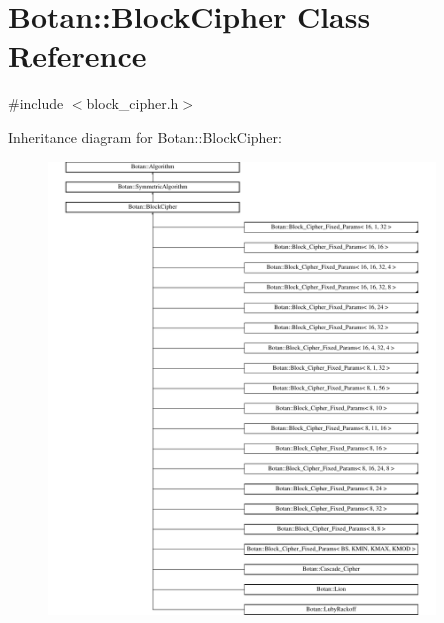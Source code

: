\hypertarget{classBotan_1_1BlockCipher}{\section{Botan\-:\-:Block\-Cipher Class Reference}
\label{classBotan_1_1BlockCipher}
}


{\ttfamily \#include $<$block\-\_\-cipher.\-h$>$}

Inheritance diagram for Botan\-:\-:Block\-Cipher\-:\begin{figure}[H]
\begin{center}
\leavevmode
\includegraphics[height=12.000000cm]{classBotan_1_1BlockCipher}
\end{center}
\end{figure}
